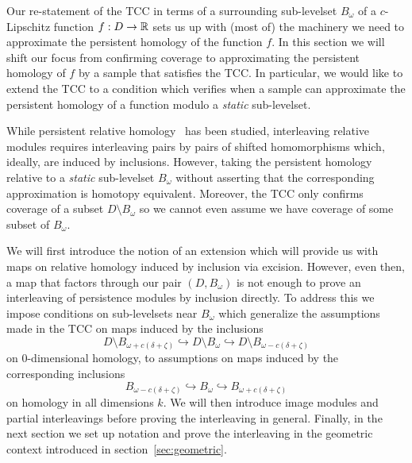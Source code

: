 
Our re-statement of the TCC in terms of a surrounding sub-levelset $B_\omega$ of a $c$-Lipschitz function $f : D\to \mathbb{R}$ sets us up with (most of) the machinery we need to approximate the persistent homology of the function $f$.
In this section we will shift our focus from confirming coverage to approximating the persistent homology of $f$ by a sample that satisfies the TCC.
In particular, we would like to extend the TCC to a condition which verifies when a sample can approximate the persistent homology of a function modulo a \emph{static} sub-levelset.

While persistent relative homology~\cite{todo} has been studied, interleaving relative modules requires interleaving pairs by pairs of shifted homomorphisms which, ideally, are induced by inclusions.
However, taking the persistent homology relative to a \emph{static} sub-levelset $B_\omega$ without asserting that the corresponding approximation is homotopy equivalent.
Moreover, the TCC only confirms coverage of a subset $D\setminus B_\omega$ so we cannot even assume we have coverage of some subset of $B_\omega$.

We will first introduce the notion of an extension which will provide us with maps on relative homology induced by inclusion via excision.
However, even then, a map that factors through our pair $(D, B_\omega)$ is not enough to prove an interleaving of persistence modules by inclusion directly.
To address this we impose conditions on sub-levelsets near $B_\omega$ which generalize the assumptions made in the TCC on maps induced by the inclusions
\[ D\setminus B_{\omega+c(\delta+\zeta)}\hookrightarrow D\setminus B_\omega\hookrightarrow D\setminus B_{\omega-c(\delta+\zeta)}\]
on $0$-dimensional homology, to assumptions on maps induced by the corresponding inclusions
\[ B_{\omega-c(\delta+\zeta)}\hookrightarrow B_\omega\hookrightarrow B_{\omega+c(\delta+\zeta)}\]
on homology in all dimensions $k$.
We will then introduce image modules and partial interleavings before proving the interleaving in general.
Finally, in the next section we set up notation and prove the interleaving in the geometric context introduced in section~\ref{sec:geometric}.
